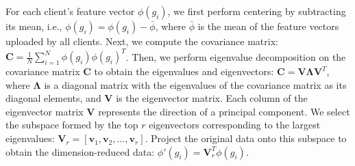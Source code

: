 \documentclass[conference]{IEEEtran}
\begin{document}
For each client's feature vector $\phi(g_i)$, we first perform centering by subtracting its mean, i.e., $\phi(g_i) = \phi(g_i) - \bar{\phi}$, where $\bar{\phi}$ is the mean of the feature vectors uploaded by all clients. Next, we compute the covariance matrix: $\mathbf{C} = \frac{1}{N} \sum_{i=1}^N \phi(g_i) \phi(g_i)^T$. Then, we perform eigenvalue decomposition on the covariance matrix $\mathbf{C}$ to obtain the eigenvalues and eigenvectors: $\mathbf{C} = \mathbf{V} \mathbf{\Lambda} \mathbf{V}^T$, where $\mathbf{\Lambda}$ is a diagonal matrix with the eigenvalues of the covariance matrix as its diagonal elements, and $\mathbf{V}$ is the eigenvector matrix. Each column of the eigenvector matrix $\mathbf{V}$ represents the direction of a principal component. We select the subspace formed by the top $r$ eigenvectors corresponding to the largest eigenvalues: $\mathbf{V}_r = [\mathbf{v}_1, \mathbf{v}_2, \ldots, \mathbf{v}_r]$. Project the original data onto this subspace to obtain the dimension-reduced data: $\phi'(g_i) = \mathbf{V}_r^T \phi(g_i)$.






\end{document}
